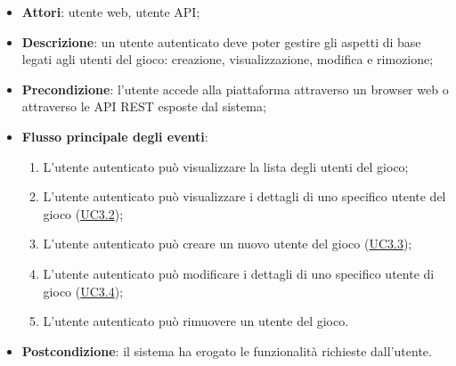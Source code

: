 \begin{itemize}
\item \textbf{Attori}: utente web, utente API;
\item \textbf{Descrizione}: un utente autenticato deve poter gestire gli aspetti di base legati agli utenti del gioco: creazione, visualizzazione, modifica e rimozione; 
      \item \textbf{Precondizione}: l'utente accede alla piattaforma attraverso un browser web o attraverso le API REST esposte dal sistema;

        \item \textbf{Flusso principale degli eventi}:
          \begin{enumerate}
          \item L'utente autenticato può visualizzare la lista degli utenti del gioco;
          \item L'utente autenticato può visualizzare i dettagli di uno specifico utente del gioco (\hyperlink{UC3.2}{UC3.2});
          \item L'utente autenticato può creare un nuovo utente del gioco (\hyperlink{UC3.3}{UC3.3});
          \item L'utente autenticato può modificare i dettagli di uno specifico utente di gioco (\hyperlink{UC3.4}{UC3.4});
          \item L'utente autenticato può rimuovere un utente del gioco.

      \end{enumerate}
    \item \textbf{Postcondizione}: il sistema ha erogato le funzionalità richieste dall'utente.
  \end{itemize}

\hypertarget{UC3.2}{}
